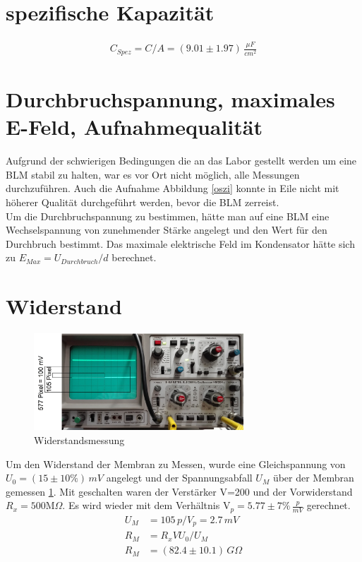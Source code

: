 \documentclass{include/thesisclass3}
\newcommand{\e}[1]{\,\si{#1}}
\begin{document}
\section{spezifische Kapazität}
\begin{align}
C_{Spez}=C/A=(9.01 \pm 1.97)\e{\frac{\mu F}{cm^2}}
\end{align}
\section{Durchbruchspannung, maximales E-Feld, Aufnahmequalität}
Aufgrund der schwierigen Bedingungen die an das Labor gestellt werden um eine BLM stabil zu halten, war es vor Ort nicht möglich, alle Messungen durchzuführen. Auch die Aufnahme Abbildung \ref{oszi} konnte in Eile nicht mit höherer Qualität durchgeführt werden, bevor die BLM zerreist.\\
Um die Durchbruchspannung zu bestimmen, hätte man auf eine BLM eine Wechselspannung von zunehmender Stärke angelegt und den Wert für den Durchbruch bestimmt. Das maximale elektrische Feld im Kondensator hätte sich zu $E_{Max}=U_{Durchbruch}/d$ berechnet.
\section{Widerstand}
\begin{figure}[ht]
	\begin{center}
		\includegraphics[width=0.7\textwidth]{images/Widerstand.png}
		\caption{Widerstandsmessung}
		\label{resistance}
	\end{center}
\end{figure}
Um den Widerstand der Membran zu Messen, wurde eine Gleichspannung von $U_0=(15 \pm 10\%)\e{mV}$ angelegt und der Spannungsabfall $U_M$ über der Membran gemessen \ref{resistance}. Mit geschalten waren der Verstärker V=200 und der Vorwiderstand $R_x=500\text{M}\Omega$. Es wird wieder mit dem Verhältnis V$_p=5.77 \pm 7\% \e{\frac{p}{mV}}$ gerechnet.
\begin{align*}
	U_M&= 105\e{p}/V_p= 2.7 \e{mV}\\
	R_M&=R_x V U_0 /U_M\\
	R_M&=(82.4 \pm 10.1)\e{G\Omega}
\end{align*}
\end{document}
